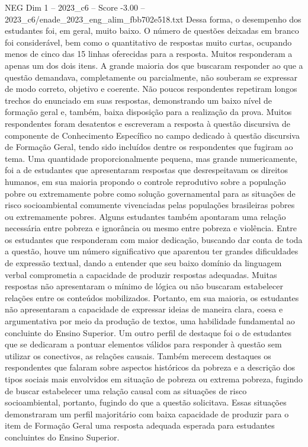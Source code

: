 \begin{textsample}{NEG Dim 1 – 2023\_c6 – Score -3.00 – 2023\_c6/enade\_2023\_eng\_alim\_fbb702e518.txt}
Dessa forma, o desempenho dos estudantes foi, em geral, muito baixo.
O número de questões deixadas em branco foi considerável, bem como o quantitativo de respostas muito curtas, ocupando menos de cinco das 15 linhas oferecidas para a resposta.
Muitos responderam a apenas um dos dois itens.
A grande maioria dos que buscaram responder ao que a questão demandava, completamente ou parcialmente, não souberam se expressar de modo correto, objetivo e coerente.
Não poucos respondentes repetiram longos trechos do enunciado em suas respostas, demonstrando um baixo nível de formação geral e, também, baixa disposição para a realização da prova.
Muitos respondentes foram desatentos e escreveram a resposta à questão discursiva de componente de Conhecimento Específico no campo dedicado à questão discursiva de Formação Geral, tendo sido incluídos dentre os respondentes que fugiram ao tema.
Uma quantidade proporcionalmente pequena, mas grande numericamente, foi a de estudantes que apresentaram respostas que desrespeitavam os direitos humanos, em sua maioria propondo o controle reprodutivo sobre a população pobre ou extremamente pobre como solução governamental para as situações de risco socioambiental comumente vivenciadas pelas populações brasileiras pobres ou extremamente pobres.
Alguns estudantes também apontaram uma relação necessária entre pobreza e ignorância ou mesmo entre pobreza e violência.
Entre os estudantes que responderam com maior dedicação, buscando dar conta de toda a questão, houve um número significativo que aparentou ter grandes dificuldades de expressão textual, dando a entender que seu baixo domínio da linguagem verbal comprometia a capacidade de produzir respostas adequadas.
Muitas respostas não apresentaram o mínimo de lógica ou não buscaram estabelecer relações entre os conteúdos mobilizados.
Portanto, em sua maioria, os estudantes não apresentaram a capacidade de expressar ideias de maneira clara, coesa e argumentativa por meio da produção de textos, uma habilidade fundamental ao concluinte do Ensino Superior.
Um outro perfil de destaque foi o de estudantes que se dedicaram a pontuar elementos válidos para responder à questão sem utilizar os conectivos, as relações causais.
Também merecem destaques os respondentes que falaram sobre aspectos históricos da pobreza e a descrição dos tipos sociais mais envolvidos em situação de pobreza ou extrema pobreza, fugindo de buscar estabelecer uma relação causal com as situações de risco socioambiental, portanto, fugindo do que a questão solicitava.
Essas situações demonstraram um perfil majoritário com baixa capacidade de produzir para o item de Formação Geral uma resposta adequada esperada para estudantes concluintes do Ensino Superior.

\end{textsample}
